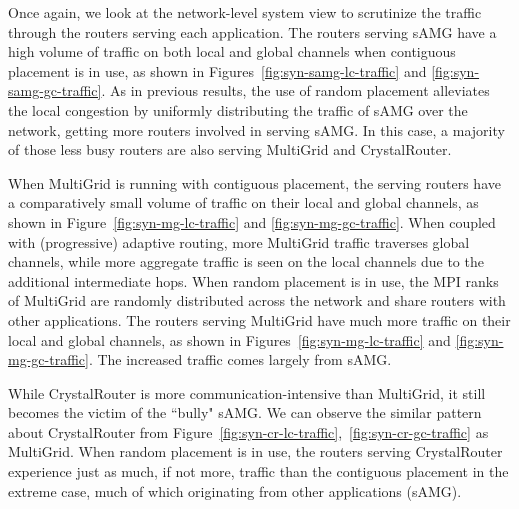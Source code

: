 Once again, we look at the network-level system view to scrutinize the traffic through the routers serving each application. 
The routers serving sAMG have a high volume of traffic on both local and global channels when contiguous placement is in use, 
as shown in Figures~\ref{fig:syn-samg-lc-traffic} and \ref{fig:syn-samg-gc-traffic}.
As in previous results, the use of random placement alleviates the local congestion by uniformly distributing the traffic of sAMG over the network, getting more routers involved in serving sAMG.
In this case, a majority of those less busy routers are also serving MultiGrid and CrystalRouter.



When MultiGrid is running with contiguous placement, the serving routers have a comparatively small volume of traffic on their local and global channels, as shown in Figure~\ref{fig:syn-mg-lc-traffic} and \ref{fig:syn-mg-gc-traffic}. When coupled with (progressive) adaptive routing, more MultiGrid traffic traverses global channels, while more aggregate traffic is seen on the local channels due to the additional intermediate hops.
When random placement is in use, the MPI ranks of MultiGrid are randomly distributed across the network and share routers with other applications. The routers serving MultiGrid have much more traffic on their local and global channels, as shown in Figures~\ref{fig:syn-mg-lc-traffic} and \ref{fig:syn-mg-gc-traffic}. The increased traffic comes largely from sAMG.

While CrystalRouter is more communication-intensive than MultiGrid, it still becomes the victim of the ``bully" sAMG. We can observe the similar pattern about CrystalRouter from Figure~\ref{fig:syn-cr-lc-traffic},~\ref{fig:syn-cr-gc-traffic} as MultiGrid. When random placement is in use, the routers serving CrystalRouter experience just as much, if not more, traffic than the contiguous placement in the extreme case, much of which originating from other applications (sAMG).



